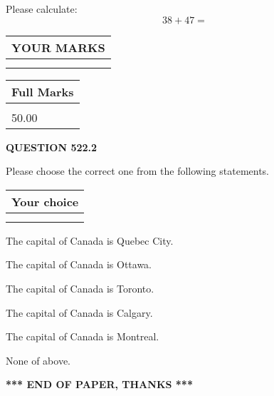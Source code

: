 \documentclass[12pt]{article}
\begin{document}
  
 
Please calculate:
\begin{equation}
38 +  %
47 = \nonumber
\end{equation}
 

 

 
  
\vspace{0.2in}
  
\noindent\begin{tabular}{|l|}
\hline
 YOUR MARKS  \\
\hline
 \\ 
 \\ 
\hline
\end{tabular}
\hspace{0.05in} \begin{tabular}{|l|}
\hline
 Full Marks  \\
\hline
 \\ 
50.00 \\
\hline
\end{tabular}
{\textbf{\Large{QUESTION
522.2 
}}}
  
  
Please choose the correct one from the following statements.
  
  
\noindent\hspace{3.0in} \begin{tabular}{|l|}
\hline
Your choice \\
\hline
 \\ 
 \\ 
\hline
\end{tabular}
  
  
 
 
The capital of Canada is Quebec City.
 
 
The capital of Canada is Ottawa.
 
 
The capital of Canada is Toronto.
 
 
The capital of Canada is Calgary.
 
 
The capital of Canada is Montreal.
 
 
 None of above.
 
 
   
   
 \vspace{0.2in}
 
   
   
   
   
\vspace{1.0in} 
{\textbf{\large{ *** END OF PAPER, THANKS *** }}} 
   
\end{document}

